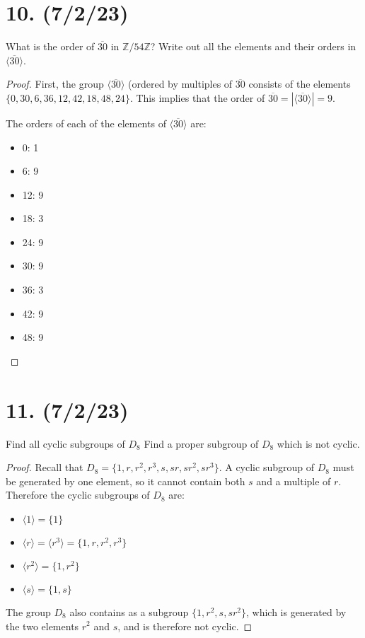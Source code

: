 \documentclass{article}
\begin{document}
\section*{10. (7/2/23)}

What is the order of $\overline{30}$ in $\mathbb{Z}/54\mathbb{Z}$? Write out all the elements and their orders in $\langle \overline{30} \rangle$.

\begin{proof}
    First, the group $\langle \overline{30} \rangle$ (ordered by multiples of $\overline{30}$ consists of the elements $\{ 0, 30, 6, 36, 12, 42, 18, 48, 24 \}$. This implies that the order of $\overline{30} = |\langle \overline{30} \rangle| = 9$.

    The orders of each of the elements of $\langle \overline{30} \rangle$ are:
    \begin{itemize}[itemsep=0em]
        \item 0: 1
        \item 6: 9
        \item 12: 9
        \item 18: 3
        \item 24: 9
        \item 30: 9
        \item 36: 3
        \item 42: 9
        \item 48: 9
    \end{itemize}
\end{proof}

\section*{11. (7/2/23)}

Find all cyclic subgroups of $D_8$ Find a proper subgroup of $D_8$ which is not cyclic.

\begin{proof}
    Recall that $D_8 = \{ 1, r, r^2, r^3, s, sr, sr^2, sr^3 \}$. A cyclic subgroup of $D_8$ must be generated by one element, so it cannot contain both $s$ and a multiple of $r$. Therefore the cyclic subgroups of $D_8$ are:
    \begin{itemize}[itemsep=0em]
        \item $\langle 1 \rangle = \{ 1 \}$
        \item $\langle r \rangle = \langle r^3 \rangle = \{ 1, r, r^2, r^3 \}$
        \item $\langle r^2 \rangle = \{ 1, r^2 \}$
        \item $\langle s \rangle = \{ 1, s \}$
    \end{itemize}
    The group $D_8$ also contains as a subgroup $\{ 1, r^2, s, sr^2 \}$, which is generated by the two elements $r^2$ and $s$, and is therefore not cyclic.
\end{proof}
\end{document}
